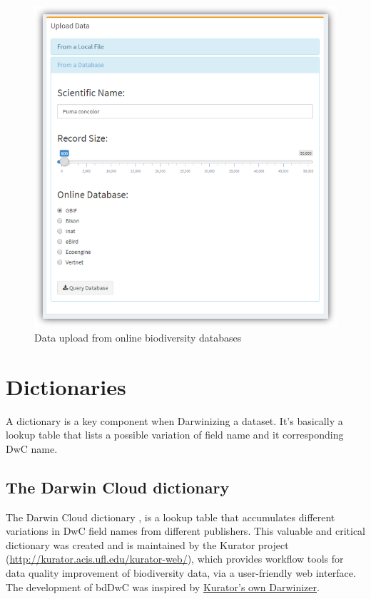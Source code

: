 \documentclass[]{book}
\theoremstyle{definition}
\theoremstyle{definition}
\theoremstyle{definition}
\theoremstyle{remark}
\begin{document}
\begin{figure}
\centering
\includegraphics{img/bdDwC_Up-database.png}
\caption{Data upload from online biodiversity databases}
\end{figure}

\section{Dictionaries}\label{dictionaries}

A dictionary is a key component when Darwinizing a dataset. It's
basically a lookup table that lists a possible variation of field name
and it corresponding DwC name.

\hypertarget{the-darwin-cloud-dictionary}{\subsection{The Darwin Cloud
dictionary}\label{the-darwin-cloud-dictionary}}

The Darwin Cloud dictionary \citep{DarwinCloud}, is a lookup table that
accumulates different variations in DwC field names from different
publishers. This valuable and critical dictionary was created and is
maintained by the Kurator project
(\url{http://kurator.acis.ufl.edu/kurator-web/}), which provides
workflow tools for data quality improvement of biodiversity data, via a
user-friendly web interface. The development of bdDwC was inspired by
\href{https://github.com/kurator-org/kurator-validation/wiki/CSV-File-Darwinizer\%20target=\%22_blank\%22}{Kurator's
own Darwinizer}.
\end{document}
